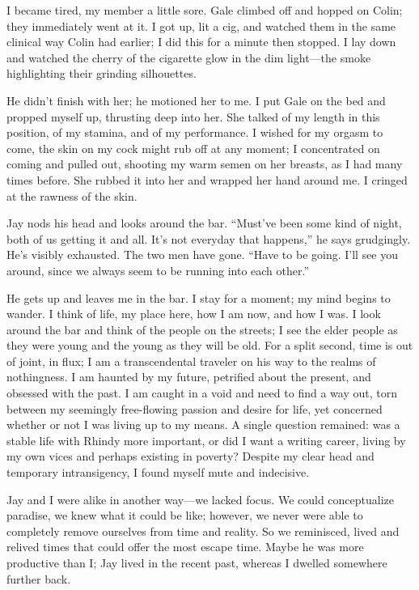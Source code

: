 I became tired, my member a little sore. Gale climbed off and hopped on
Colin; they immediately went at it. I got up, lit a cig, and watched
them in the same clinical way Colin had earlier; I did this for a minute
then stopped. I lay down and watched the cherry of the cigarette glow in
the dim light---the smoke highlighting their grinding silhouettes.

He didn't finish with her; he motioned her to me. I put Gale on the bed
and propped myself up, thrusting deep into her. She talked of my length
in this position, of my stamina, and of my performance. I wished for my
orgasm to come, the skin on my cock might rub off at any moment; I
concentrated on coming and pulled out, shooting my warm semen on her
breasts, as I had many times before. She rubbed it into her and wrapped
her hand around me. I cringed at the rawness of the skin.

Jay nods his head and looks around the bar. ``Must've been some kind of
night, both of us getting it and all. It's not everyday that happens,''
he says grudgingly. He's visibly exhausted. The two men have gone.
``Have to be going. I'll see you around, since we always seem to be
running into each other.''

He gets up and leaves me in the bar. I stay for a moment; my mind begins
to wander. I think of life, my place here, how I am now, and how I was.
I look around the bar and think of the people on the streets; I see the
elder people as they were young and the young as they will be old. For a
split second, time is out of joint, in flux; I am a transcendental
traveler on his way to the realms of nothingness. I am haunted by my
future, petrified about the present, and obsessed with the past. I am
caught in a void and need to find a way out, torn between my seemingly
free-flowing passion and desire for life, yet concerned whether or not I
was living up to my means. A single question remained: was a stable life
with Rhindy more important, or did I want a writing career, living by my
own vices and perhaps existing in poverty? Despite my clear head and
temporary intransigency, I found myself mute and indecisive.

Jay and I were alike in another way---we lacked focus. We could
conceptualize paradise, we knew what it could be like; however, we never
were able to completely remove ourselves from time and reality. So we
reminisced, lived and relived times that could offer the most escape
time. Maybe he was more productive than I; Jay lived in the recent past,
whereas I dwelled somewhere further back.

